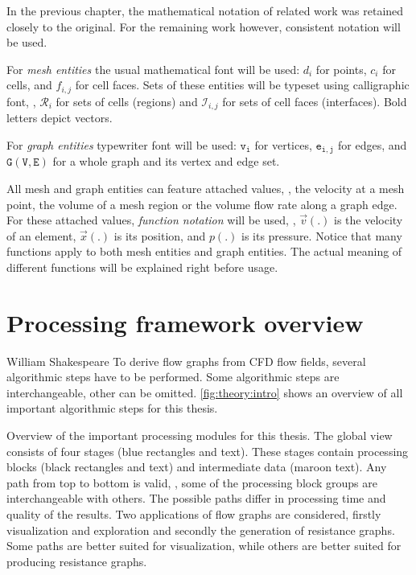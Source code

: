In the previous chapter, the mathematical notation of related work was retained closely to the original. For the remaining work however, consistent notation will be used.

For \emph{mesh entities} the usual mathematical font will be used: $d_i$ for points, $c_i$ for cells, and $f_{i,j}$ for cell faces. Sets of these entities will be typeset using calligraphic font, \eg, $\mathcal{R}_i$ for sets of cells (regions) and $\mathcal{I}_{i,j}$ for sets of cell faces (interfaces). Bold letters depict vectors.

For \emph{graph entities} typewriter font will be used: $\mathtt{v_i}$ for vertices, $\mathtt{e_{i,j}}$ for edges, and $\mathtt{G(V, E)}$ for a whole graph and its vertex and edge set.

\hspace{0pt}
%
All mesh and graph entities can feature attached values, \eg, the velocity at a mesh point, the volume of a mesh region or the volume flow rate along a graph edge. For these attached values, \emph{function notation} will be used, \eg, $\vec{v}(.)$ is the velocity of an element, $\vec{x}(.)$ is its position, and $p(.)$ is its pressure. Notice that many functions apply to both mesh entities and graph entities. The actual meaning of different functions will be explained right before usage.


\section{Processing framework overview}

{William Shakespeare}
%
To derive flow graphs from \ac{CFD} flow fields, several algorithmic steps have to be performed. Some algorithmic steps are interchangeable, other can be omitted. \autoref{fig:theory:intro} shows an overview of all important algorithmic steps for this thesis.

{Overview of the important processing modules for this thesis. The global view consists of four stages (blue rectangles and text). These stages contain processing blocks (black rectangles and text) and intermediate data (maroon text). Any path from top to bottom is valid, \ie, some of the processing block groups are interchangeable with others. The possible paths differ in processing time and quality of the results. Two applications of flow graphs are considered, firstly visualization and exploration and secondly the generation of resistance graphs. Some paths are better suited for visualization, while others are better suited for producing resistance graphs.}

